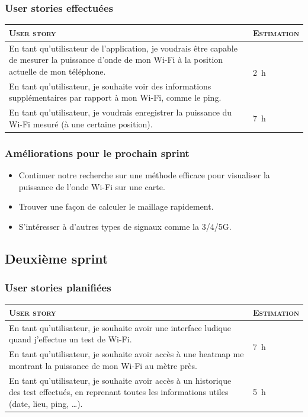 \documentclass{elsarticle}
\newcommand{\est}[1]{\multirow{2}{*}{\SI{#1}{\hour}}}
\begin{document}
\subsubsection{User stories effectuées}
\begin{table}[H]
	\centering
	\begin{tabular}{p{14cm}m{2cm}}
		\toprule
		\textsc{User story} & \textsc{Estimation}\\
		\midrule
		En tant qu'utilisateur de l'application, je voudrais être capable de mesurer la puissance d'onde de mon Wi-Fi à la position actuelle de mon téléphone. & \est{2}\\
		\midrule
		En tant qu'utilisateur, je souhaite voir des informations supplémentaires par rapport à mon Wi-Fi, comme le ping. & \est{8}\\
		\midrule
		En tant qu'utilisateur, je voudrais enregistrer la puissance du Wi-Fi mesuré (à une certaine position). & \est{7}\\
		\bottomrule
	\end{tabular}
\end{table}

\subsubsection{Améliorations pour le prochain sprint}
\begin{itemize}
	\item Continuer notre recherche sur une méthode efficace pour visualiser la puissance de l’onde Wi-Fi sur une carte.
	\item Trouver une façon de calculer le maillage rapidement.
	\item S’intéresser à d’autres types de signaux comme la 3/4/5G.
\end{itemize}

\subsection{Deuxième sprint}
\subsubsection{User stories planifiées}
\begin{table}[H]
	\centering
	\begin{tabular}{p{14cm}m{2cm}}
		\toprule
		\textsc{User story} & \textsc{Estimation}\\
		\midrule
		En tant qu'utilisateur, je souhaite avoir une interface ludique quand j'effectue un test de Wi-Fi. & \est{7}\\
		\midrule
		En tant qu'utilisateur, je souhaite avoir accès à une heatmap me montrant la puissance de mon Wi-Fi au mètre près. & \est{30}\\
		\midrule
		En tant qu'utilisateur, je souhaite avoir accès à un historique des test effectués, en reprenant toutes les informations utiles (date, lieu, ping, \ldots). & \est{5}\\
		\bottomrule
	\end{tabular}
\end{table}
\end{document}
